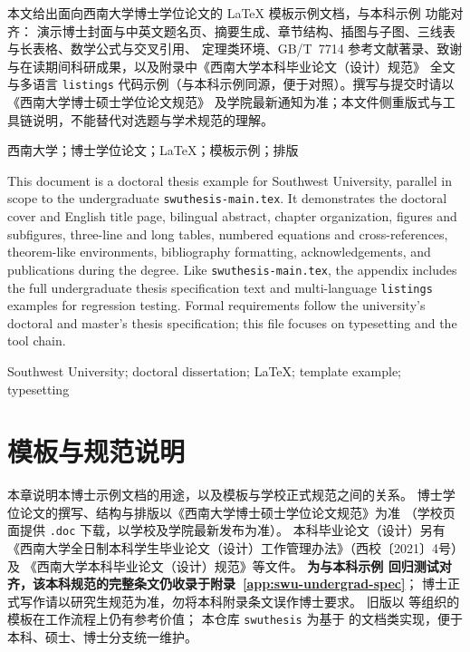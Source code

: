 \begin{cnabstract}
本文给出面向西南大学博士学位论文的 \LaTeX{} 模板示例文档，与本科示例  功能对齐：
演示博士封面与中英文题名页、摘要生成、章节结构、插图与子图、三线表与长表格、数学公式与交叉引用、
定理类环境、GB/T~7714 参考文献著录、致谢与在读期间科研成果，以及附录中《西南大学本科毕业论文（设计）规范》
全文与多语言 \texttt{listings} 代码示例（与本科示例同源，便于对照）。撰写与提交时请以《西南大学博士硕士学位论文规范》
及学院最新通知为准；本文件侧重版式与工具链说明，不能替代对选题与学术规范的理解。
\end{cnabstract}
\begin{cnkeywords}
西南大学；博士学位论文；\LaTeX；模板示例；排版
\end{cnkeywords}
\begin{enabstract}
This document is a doctoral thesis example for Southwest University, parallel in scope to the undergraduate
\texttt{swuthesis-main.tex}. It demonstrates the doctoral cover and English title page, bilingual abstract,
chapter organization, figures and subfigures, three-line and long tables, numbered equations and cross-references,
theorem-like environments, bibliography formatting, acknowledgements, and publications during the degree.
Like \texttt{swuthesis-main.tex}, the appendix includes the full undergraduate thesis specification text and
multi-language \texttt{listings} examples for regression testing. Formal requirements follow the university's
doctoral and master's thesis specification; this file focuses on typesetting and the tool chain.
\end{enabstract}
\begin{enkeywords}
Southwest University; doctoral dissertation; \LaTeX; template example; typesetting
\end{enkeywords}
\makeabstract

\mainmatter
\chapter{模板与规范说明}\label{ch:doctor-guide}

本章说明本博士示例文档的用途，以及模板与学校正式规范之间的关系。
博士学位论文的撰写、结构与排版以《西南大学博士硕士学位论文规范》为准\cite{swu2022gradThesisSpecDoc}
（学校页面提供 \texttt{.doc} 下载，以学校及学院最新发布为准）。
本科毕业论文（设计）另有《西南大学全日制本科学生毕业论文（设计）工作管理办法》（西校〔2021〕4号）及
《西南大学本科毕业论文（设计）规范》等文件\cite{swu2021thesisManageNotice,swuUndergradThesisSpecWeb}。
\textbf{为与本科示例  回归测试对齐，该本科规范的完整条文仍收录于附录~\ref{app:swu-undergrad-spec}}；
博士正式写作请以研究生规范为准，勿将本科附录条文误作博士要求。
旧版以  等组织的模板在工作流程上仍有参考价值\cite{bao2024swuthesisLegacy}；
本仓库 \texttt{swuthesis} 为基于  的文档类实现，便于本科、硕士、博士分支统一维护。

